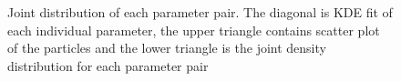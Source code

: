 \begin{figure}[ht]
    \begin{center}
    \end{center}
    \caption[Joint density distribution of each parameter pair]%
    {Joint distribution of each parameter pair. The diagonal is KDE fit of each individual parameter, the upper triangle contains scatter plot of the particles and the lower triangle is the joint density distribution for each parameter pair}
    \label{fig:model5_para_joint}
\end{figure}

